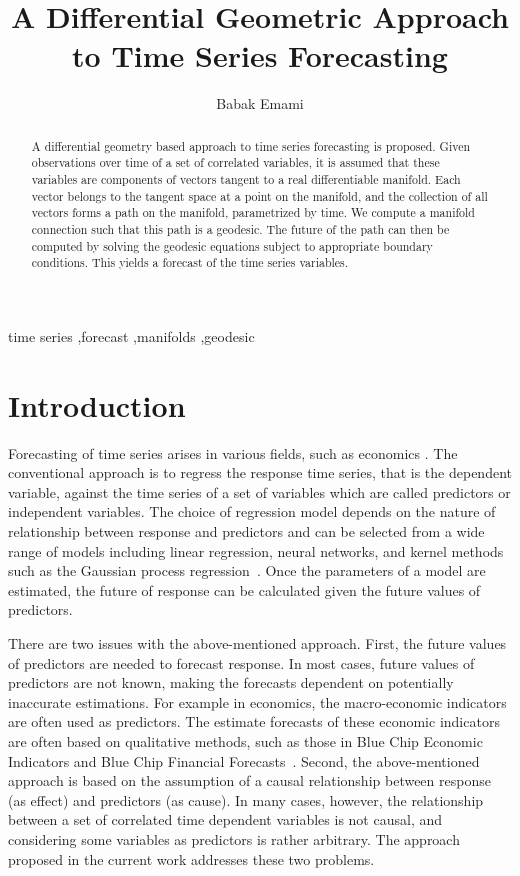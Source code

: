 \documentclass[a4paper,11pt]{elsarticle}
\title{A Differential Geometric Approach to Time Series Forecasting}
\author[1]{Babak Emami\corref{cor1}%
\fnref{fn1}}
\begin{document}
\begin{abstract}
  
A differential geometry based approach to time series forecasting is
proposed. Given observations over time of a set of correlated
variables, it is assumed that these variables are components of
vectors tangent to a real differentiable manifold. Each vector belongs
to the tangent space at a point on the manifold, and the collection of
all vectors forms a path on the manifold, parametrized by time. We
compute a manifold connection such that this path is a geodesic. The
future of the path can then be computed by solving the geodesic
equations subject to appropriate boundary conditions. This yields a
forecast of the time series variables.

\end{abstract}

\begin{keyword}
time series \sep forecast \sep manifolds \sep geodesic
\end{keyword}

\maketitle

\section{Introduction}\label{section:introduction}

Forecasting of time series arises in various fields, such as economics
\cite{kennedy-1998, fabozzi-etal-2014}. The conventional approach is
to regress the response time series, that is the dependent variable,
against the time series of a set of variables which are called
predictors or independent variables. The choice of regression model
depends on the nature of relationship between response and predictors
and can be selected from a wide range of models including linear
regression, neural networks, and kernel methods such as the Gaussian
process
regression~\cite{hastie-etal-2009,rasmussen-williams-2005}. Once the
parameters of a model are estimated, the future of response can be
calculated given the future values of predictors.

There are two issues with the above-mentioned approach. First, the
future values of predictors are needed to forecast response. In most
cases, future values of predictors are not known, making the forecasts
dependent on potentially inaccurate estimations. For example in
economics, the macro-economic indicators are often used as
predictors. The estimate forecasts of these economic indicators are
often based on qualitative methods, such as those in Blue Chip
Economic Indicators and Blue Chip Financial
Forecasts~\cite{blue-chip}. Second, the above-mentioned approach
is based on the assumption of a causal relationship between response
(as effect) and predictors (as cause). In many cases, however, the
relationship between a set of correlated time dependent variables is
not causal, and considering some variables as predictors is rather
arbitrary. The approach proposed in the current work addresses these
two problems.
\end{document}
